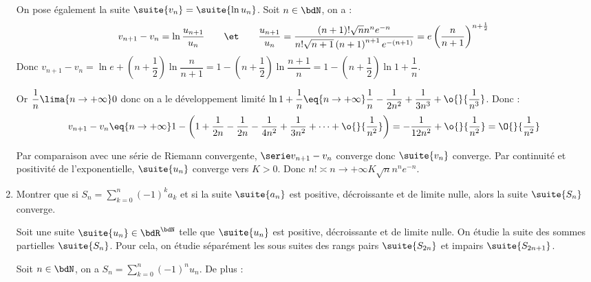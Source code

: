 \documentclass[a4paper,french,bookmarks]{article}
\begin{document}
\begin{enumerate}
{        On pose également la suite $\suite{v_n} = \suite{\ln{u_n}}$. Soit $n \in \bdN$, on a :
        \[ v_{n+1} - v_n = \ln{\dfrac{u_{n+1}}{u_n}} \qquad\et\qquad \dfrac{u_{n+1}}{u_n} = \dfrac{\left(n+1\right)!\sqrt{n}n^ne^{-n}}{n!\sqrt{n+1}\left(n+1\right)^{n+1}e^{-\left(n+1\right)}} = e\left(\dfrac{n}{n+1}\right)^{n + \frac{1}{2}} \]
        Donc $v_{n+1} - v_n = \ln{e} + \left(n + \dfrac{1}{2}\right)\ln{\dfrac{n}{n+1}} = 1 - \left(n + \dfrac{1}{2}\right)\ln{\dfrac{n+1}{n}} = 1 - \left(n + \dfrac{1}{2}\right)\ln{1 + \dfrac{1}{n}}$. 
        
        Or $\dfrac{1}{n} \lima{n \to +\infty} 0$ donc on a le développement limité $\ln{1 + \dfrac{1}{n}} \eq{n \to +\infty} \dfrac{1}{n} - \dfrac{1}{2n^2} + \dfrac{1}{3n^3} + \o{}{\dfrac{1}{n^3}}$. Donc :
        \[ v_{n+1} - v_n \eq{n \to +\infty} 1 - \left(1 + \dfrac{1}{2n} - \dfrac{1}{2n} - \dfrac{1}{4n^2} + \dfrac{1}{3n^2} + \dots + \o{}{\dfrac{1}{n^2}}\right) = -\dfrac{1}{12n^2} + \o{}{\dfrac{1}{n^2}} = \O{}{\dfrac{1}{n^2}}\]
        
        Par comparaison avec une série de Riemann convergente, $\serie v_{n+1} - v_n$ converge donc $\suite{v_n}$ converge. Par continuité et positivité de l'exponentielle, $\suite{u_n}$ converge vers $K > 0$. Donc $n! \asymp{n \to +\infty} K \sqrt{n} n^n e^{-n}$.
    }
    
    \item Montrer que si $\displaystyle S_n = \sum_{k=0}^n (-1)^k a_k$ et si la suite $\suite{a_n}$ est positive, décroissante et de limite nulle, alors la suite $\suite{S_n}$ converge.
    
    \noafter
    \nobefore\yesafter
    \begin{nproof}
        Soit une suite $\suite{u_n} \in \bdR^\bdN$ telle que $\suite{u_n}$ est positive, décroissante et de limite nulle. On étudie la suite des sommes partielles $\suite{S_n}$. Pour cela, on étudie séparément les sous suites des rangs pairs $\suite{S_{2n}}$ et impairs $\suite{S_{2n+1}}$.
        
        Soit $n \in \bdN$, on a $S_n = \displaystyle\sum_{k=0}^n \left(-1\right)^n u_n$. De plus :
        

\end{nproof}
\end{enumerate}
\end{document}
